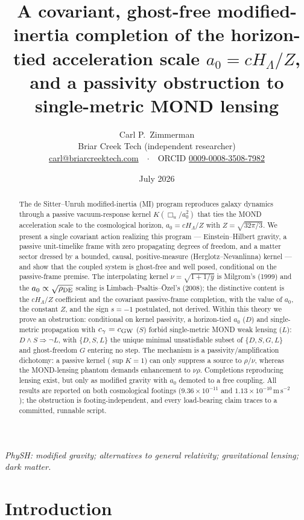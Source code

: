 \documentclass[11pt]{article}
\title{\bfseries A covariant, ghost-free modified-inertia completion of the horizon-tied acceleration scale $a_0=cH_\Lambda/Z$, and a passivity obstruction to single-metric MOND lensing}
\author{Carl P.\ Zimmerman\\[2pt]
\normalsize Briar Creek Tech (independent researcher)\\
\normalsize \href{mailto:carl@briarcreektech.com}{carl@briarcreektech.com}\ \ $\cdot$\ \ ORCID \href{https://orcid.org/0009-0008-3508-7982}{0009-0008-3508-7982}}
\date{July 2026}
\newcommand{\ms}{\mathrm{m\,s^{-2}}}
\newcommand{\Boxu}{\Box_u}
\newcommand{\cgw}{c_{\rm GW}}
\begin{document}
\maketitle

\begin{abstract}
\noindent
The de Sitter--Unruh modified-inertia (MI) program reproduces galaxy dynamics through a passive vacuum-response kernel $K(\Boxu/a_0^2)$ that ties the MOND acceleration scale to the cosmological horizon, $a_0=cH_\Lambda/Z$ with $Z=\sqrt{32\pi/3}$. We present a single covariant action realizing this program --- Einstein--Hilbert gravity, a passive unit-timelike frame with zero propagating degrees of freedom, and a matter sector dressed by a bounded, causal, positive-measure (Herglotz--Nevanlinna) kernel --- and show that the coupled system is ghost-free and well posed, conditional on the passive-frame premise. The interpolating kernel $\nu=\sqrt{1+1/y}$ is Milgrom's (1999) and the $a_0\propto\sqrt{\rho_{\rm DE}}$ scaling is Limbach--Psaltis--\"Ozel's (2008); the distinctive content is the $cH_\Lambda/Z$ coefficient and the covariant passive-frame completion, with the value of $a_0$, the constant $Z$, and the sign $s=-1$ postulated, not derived. Within this theory we prove an obstruction: conditional on kernel passivity, a horizon-tied $a_0$ ($D$) and single-metric propagation with $c_\gamma=\cgw$ ($S$) forbid single-metric MOND weak lensing ($L$): $D\wedge S\Rightarrow\lnot L$, with $\{D,S,L\}$ the unique minimal unsatisfiable subset of $\{D,S,G,L\}$ and ghost-freedom $G$ entering no step. The mechanism is a passivity/amplification dichotomy: a passive kernel ($\sup K=1$) can only suppress a source to $\rho/\nu$, whereas the MOND-lensing phantom demands enhancement to $\nu\rho$. Completions reproducing lensing exist, but only as modified gravity with $a_0$ demoted to a free coupling. All results are reported on both cosmological footings ($9.36\times10^{-11}$ and $1.13\times10^{-10}\,\ms$); the obstruction is footing-independent, and every load-bearing claim traces to a committed, runnable script.
\end{abstract}

\medskip
\noindent\textit{PhySH: modified gravity; alternatives to general relativity; gravitational lensing; dark matter.}

\section{Introduction}\label{sec:intro}
\end{document}
